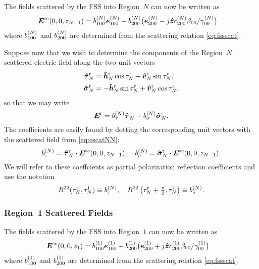\documentclass[11pt]{article}
\renewcommand{\inc}{^{\text{i}}}
\renewcommand{\refl}{^{\text{r}}}
\newcommand{\piotwo}{{\textstyle\frac{\pi}{2}}}
\begin{document}
The fields scattered by the FSS into Region~$N$ can now be written as
\begin{align}
  \boldsymbol{E}^{\text{sc}}(0,0,z_{N-1})
  &=
  b^{(N)}_{100} \boldsymbol{e}^{(N)}_{100} + b^{(N)}_{200} \bigl(\boldsymbol{e}^{(N)}_{200} -
   j \boldsymbol{\hat{z}} c_{200}^{(N)} \beta_{00} / \gamma_{00}^{(N)}  \bigr)
   \label{eq:escatNN}
\end{align}
where $b^{(N)}_{100}$ and $b^{(N)}_{200}$ are determined from the
scattering relation \eqref{eq:fssscat}.  

Suppose now that we wish to determine the components of the Region~$N$
scattered electric field along the two unit vectors 
\begin{subequations}
\begin{align}
  \tauhat_N\refl 
  & = \hhat_N\refl \cos \tau_N\refl + \vhat_N\refl \sin \tau_N\refl, \\
  \sigmahat_N\refl 
  & = - \hhat_N\refl \sin \tau_N\refl + 
  \vhat_N\refl \cos \tau_N\refl,
\end{align}
\end{subequations}
so that we may write
\begin{equation}
  \E\refl = b_\tau\enn \tauhat_N\refl + b_\sigma\enn \sigmahat_N\refl.
\end{equation}
The coefficients are easily found by dotting the corresponding unit
vectors with the scattered field from \eqref{eq:escatNN}:
\begin{equation}
  b_\tau\enn = \tauhat_N\refl \bdot   \E\scat(0,0,z_{N-1}), \quad
  b_\sigma\enn = \sigmahat_N\refl \bdot   \E\scat(0,0,z_{N-1}).
\end{equation}
We will refer to these coeffcients as partial polarization reflection
coefficients and use the notation
\begin{equation}
  R^{22}(\tau_N\refl,\tau_N\inc) \equiv b_\tau\enn, \quad
  R^{22}\left(\tau_N\refl+\piotwo,\tau_N\inc\right) \equiv b_\sigma\enn.
\end{equation}



\subsubsection{Region~1 Scattered Fields}

The fields scattered by the FSS into Region~$1$ can now be written as
\begin{align}
  \boldsymbol{E}^{\text{sc}}(0,0,z_{1})
  &=
  b^{(1)}_{100} \boldsymbol{e}^{(1)}_{100} + b^{(1)}_{200} \bigl(\boldsymbol{e}^{(1)}_{200} +
   j \boldsymbol{\hat{z}} c_{200}^{(1)} \beta_{00} / \gamma_{00}^{(1)}  \bigr)
   \label{eq:escat1N}
\end{align}
where $b^{(1)}_{100}$ and $b^{(1)}_{200}$ are determined from the
scattering relation \eqref{eq:fssscat}.  
\end{document}
